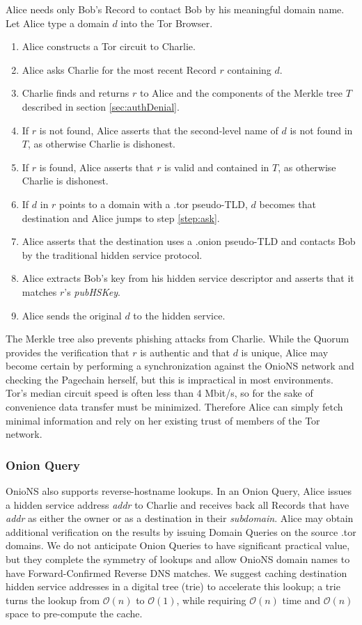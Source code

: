 \documentclass[conference]{IEEEtran}
\begin{document}
Alice needs only Bob's Record to contact Bob by his meaningful domain name. Let Alice type a domain $ d $ into the Tor Browser.

\begin{enumerate}
	\item Alice constructs a Tor circuit to Charlie.
	\item \label{step:ask} Alice asks Charlie for the most recent Record $ r $ containing $ d $.
	\item Charlie finds and returns $ r $ to Alice and the components of the Merkle tree $ T $ described in section \ref{sec:authDenial}.
	\item If $ r $ is not found, Alice asserts that the second-level name of $ d $ is not found in $ T $, as otherwise Charlie is dishonest.
	\item If $ r $ is found, Alice asserts that $ r $ is valid and contained in $ T $, as otherwise Charlie is dishonest.
	\item If $ d $ in $ r $ points to a domain with a .tor pseudo-TLD, $ d $ becomes that destination and Alice jumps to step \ref{step:ask}.
	\item Alice asserts that the destination uses a .onion pseudo-TLD and contacts Bob by the traditional hidden service protocol.
	\item Alice extracts Bob's key from his hidden service descriptor and asserts that it matches $ r $'s \emph{pubHSKey}.
	\item Alice sends the original $ d $ to the hidden service.
\end{enumerate}

The Merkle tree also prevents phishing attacks from Charlie. While the Quorum provides the verification that $ r $ is authentic and that $ d $ is unique, Alice may become certain by performing a synchronization against the OnioNS network and checking the Pagechain herself, but this is impractical in most environments. Tor's median circuit speed is often less than 4 Mbit/s,\cite{TorMetrics} so for the sake of convenience data transfer must be minimized. Therefore Alice can simply fetch minimal information and rely on her existing trust of members of the Tor network.

\subsubsection{Onion Query}

OnioNS also supports reverse-hostname lookups. In an Onion Query, Alice issues a hidden service address \emph{addr} to Charlie and receives back all Records that have \emph{addr} as either the owner or as a destination in their \emph{subdomain}. Alice may obtain additional verification on the results by issuing Domain Queries on the source .tor domains. We do not anticipate Onion Queries to have significant practical value, but they complete the symmetry of lookups and allow OnioNS domain names to have Forward-Confirmed Reverse DNS matches. We suggest caching destination hidden service addresses in a digital tree (trie) to accelerate this lookup; a trie turns the lookup from $ \mathcal{O}(n) $ to $ \mathcal{O}(1) $, while requiring $ \mathcal{O}(n) $ time and $ \mathcal{O}(n) $ space to pre-compute the cache.
\end{document}
